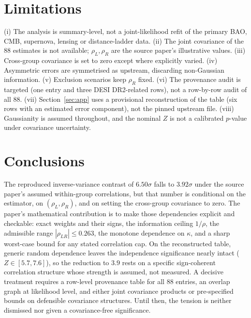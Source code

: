 \documentclass[11pt,a4paper]{article}
\theoremstyle{remark}\newtheorem{remark}{Remark}
\begin{document}
\section{Limitations}
(i) The analysis is summary-level, not a joint-likelihood refit of the primary BAO, CMB, supernova, lensing or distance-ladder data. (ii) The joint covariance of the 88 estimates is not available; $\rho_L,\rho_R$ are the source paper's illustrative values. (iii) Cross-group covariance is set to zero except where explicitly varied. (iv) Asymmetric errors are symmetrised as upstream, discarding non-Gaussian information. (v) Exclusion scenarios keep $\rho_R$ fixed. (vi) The provenance audit is targeted (one entry and three DESI DR2-related rows), not a row-by-row audit of all 88. (vii) Section~\ref{sec:app} uses a provisional reconstruction of the table (six rows with an estimated error component), not the pinned upstream file. (viii) Gaussianity is assumed throughout, and the nominal $Z$ is not a calibrated $p$-value under covariance uncertainty.

\section{Conclusions}
The reproduced inverse-variance contrast of $6.50\sigma$ falls to $3.92\sigma$ under the source paper's assumed within-group correlations, but that number is conditional on the estimator, on $(\rho_L,\rho_R)$, and on setting the cross-group covariance to zero. The paper's mathematical contribution is to make those dependencies explicit and checkable: exact weights and their signs, the information ceiling $1/\rho$, the admissible range $|\rho_{LR}|\le0.263$, the monotone dependence on $\kappa$, and a sharp worst-case bound for any stated correlation cap. On the reconstructed table, generic random dependence leaves the independence significance nearly intact ($Z\in[5.7,7.6]$), so the reduction to $3.9$ rests on a specific sign-coherent correlation structure whose strength is assumed, not measured. A decisive treatment requires a row-level provenance table for all 88 entries, an overlap graph at likelihood level, and either joint covariance products or pre-specified bounds on defensible covariance structures. Until then, the tension is neither dismissed nor given a covariance-free significance.
\end{document}
